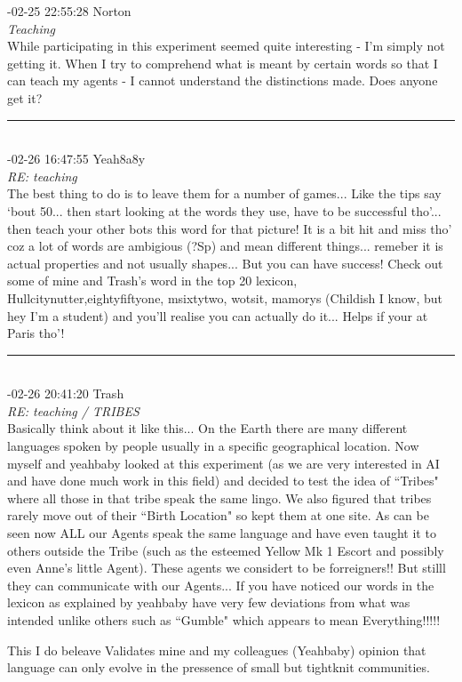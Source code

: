 \begin{mail}
{-02-25 22:55:28 Norton}\\
{\itshape Teaching}\\
While participating in this experiment seemed quite interesting - I'm simply not getting it. When I try to comprehend what is meant by certain words so that I can teach my agents - I cannot understand the distinctions made.  Does anyone get it? \\
\rule{0.8\textwidth}{.4pt}\\
{-02-26 16:47:55 Yeah8a8y}\\
{\itshape RE: teaching}\\
The best thing to do is to leave them for a number of games... Like the tips say `bout 50... then start looking at the words they use, have to be successful tho'... then teach your other bots this word for that picture! It is a bit hit and miss tho' coz a lot of words are ambigious (?Sp) and mean different things... remeber it is actual properties and not usually shapes... But you can have success! Check out some of mine and Trash's word in the top 20 lexicon, Hullcitynutter,eightyfiftyone, msixtytwo, wotsit, mamorys (Childish I know, but hey I'm a student) and you'll realise you can actually do it... Helps if your at Paris tho'!\\
\rule{0.8\textwidth}{.4pt}\\
{-02-26 20:41:20 Trash}\\
{\itshape RE: teaching / TRIBES}	\\
Basically think about it like this... On the Earth there are many different languages spoken by people usually in a specific geographical location. Now myself and yeahbaby looked at this experiment (as we are very interested in AI and have done much work in this field) and decided to test the idea of ``Tribes" where all those in that tribe speak the same lingo. We also figured that tribes rarely move out of their ``Birth Location" so kept them at one site. As can be seen now ALL our Agents speak the same language and have even taught it to others outside the Tribe (such as the esteemed Yellow Mk 1 Escort  and possibly even Anne's little Agent). 
These agents we considert to be forreigners!! But stilll they can communicate with our Agents... If you have noticed our words in the lexicon as explained by yeahbaby have  very few deviations from what was intended unlike others such as ``Gumble" which appears to mean Everything!!!!!

This I do beleave Validates mine and my colleagues (Yeahbaby) opinion that language can only evolve in the pressence of small but tightknit communities.


\end{mail}

